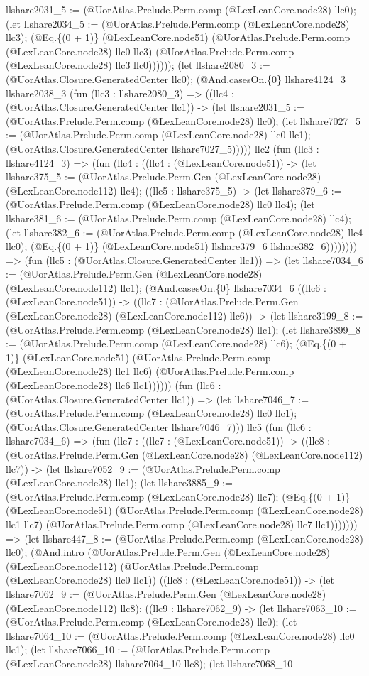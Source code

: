 \documentclass[11pt]{article}
\begin{document}
llshare2031\_5 := (@UorAtlas.Prelude.Perm.comp (@LexLeanCore.node28) llc0); (let llshare2034\_5 := (@UorAtlas.Prelude.Perm.comp (@LexLeanCore.node28) llc3); (@Eq.\{(0 + 1)\} (@LexLeanCore.node51) (@UorAtlas.Prelude.Perm.comp (@LexLeanCore.node28) llc0 llc3) (@UorAtlas.Prelude.Perm.comp (@LexLeanCore.node28) llc3 llc0)))))); (let llshare2080\_3 := (@UorAtlas.Closure.GeneratedCenter llc0); (@And.casesOn.\{0\} llshare4124\_3 llshare2038\_3 (fun (llc3 : llshare2080\_3) => ((llc4 : (@UorAtlas.Closure.GeneratedCenter llc1)) -> (let llshare2031\_5 := (@UorAtlas.Prelude.Perm.comp (@LexLeanCore.node28) llc0); (let llshare7027\_5 := (@UorAtlas.Prelude.Perm.comp (@LexLeanCore.node28) llc0 llc1); (@UorAtlas.Closure.GeneratedCenter llshare7027\_5))))) llc2 (fun (llc3 : llshare4124\_3) => (fun (llc4 : ((llc4 : (@LexLeanCore.node51)) -> (let llshare375\_5 := (@UorAtlas.Prelude.Perm.Gen (@LexLeanCore.node28) (@LexLeanCore.node112) llc4); ((llc5 : llshare375\_5) -> (let llshare379\_6 := (@UorAtlas.Prelude.Perm.comp (@LexLeanCore.node28) llc0 llc4); (let llshare381\_6 := (@UorAtlas.Prelude.Perm.comp (@LexLeanCore.node28) llc4); (let llshare382\_6 := (@UorAtlas.Prelude.Perm.comp (@LexLeanCore.node28) llc4 llc0); (@Eq.\{(0 + 1)\} (@LexLeanCore.node51) llshare379\_6 llshare382\_6)))))))) => (fun (llc5 : (@UorAtlas.Closure.GeneratedCenter llc1)) => (let llshare7034\_6 := (@UorAtlas.Prelude.Perm.Gen (@LexLeanCore.node28) (@LexLeanCore.node112) llc1); (@And.casesOn.\{0\} llshare7034\_6 ((llc6 : (@LexLeanCore.node51)) -> ((llc7 : (@UorAtlas.Prelude.Perm.Gen (@LexLeanCore.node28) (@LexLeanCore.node112) llc6)) -> (let llshare3199\_8 := (@UorAtlas.Prelude.Perm.comp (@LexLeanCore.node28) llc1); (let llshare3899\_8 := (@UorAtlas.Prelude.Perm.comp (@LexLeanCore.node28) llc6); (@Eq.\{(0 + 1)\} (@LexLeanCore.node51) (@UorAtlas.Prelude.Perm.comp (@LexLeanCore.node28) llc1 llc6) (@UorAtlas.Prelude.Perm.comp (@LexLeanCore.node28) llc6 llc1)))))) (fun (llc6 : (@UorAtlas.Closure.GeneratedCenter llc1)) => (let llshare7046\_7 := (@UorAtlas.Prelude.Perm.comp (@LexLeanCore.node28) llc0 llc1); (@UorAtlas.Closure.GeneratedCenter llshare7046\_7))) llc5 (fun (llc6 : llshare7034\_6) => (fun (llc7 : ((llc7 : (@LexLeanCore.node51)) -> ((llc8 : (@UorAtlas.Prelude.Perm.Gen (@LexLeanCore.node28) (@LexLeanCore.node112) llc7)) -> (let llshare7052\_9 := (@UorAtlas.Prelude.Perm.comp (@LexLeanCore.node28) llc1); (let llshare3885\_9 := (@UorAtlas.Prelude.Perm.comp (@LexLeanCore.node28) llc7); (@Eq.\{(0 + 1)\} (@LexLeanCore.node51) (@UorAtlas.Prelude.Perm.comp (@LexLeanCore.node28) llc1 llc7) (@UorAtlas.Prelude.Perm.comp (@LexLeanCore.node28) llc7 llc1))))))) => (let llshare447\_8 := (@UorAtlas.Prelude.Perm.comp (@LexLeanCore.node28) llc0); (@And.intro (@UorAtlas.Prelude.Perm.Gen (@LexLeanCore.node28) (@LexLeanCore.node112) (@UorAtlas.Prelude.Perm.comp (@LexLeanCore.node28) llc0 llc1)) ((llc8 : (@LexLeanCore.node51)) -> (let llshare7062\_9 := (@UorAtlas.Prelude.Perm.Gen (@LexLeanCore.node28) (@LexLeanCore.node112) llc8); ((llc9 : llshare7062\_9) -> (let llshare7063\_10 := (@UorAtlas.Prelude.Perm.comp (@LexLeanCore.node28) llc0); (let llshare7064\_10 := (@UorAtlas.Prelude.Perm.comp (@LexLeanCore.node28) llc0 llc1); (let llshare7066\_10 := (@UorAtlas.Prelude.Perm.comp (@LexLeanCore.node28) llshare7064\_10 llc8); (let llshare7068\_10 
\end{document}
